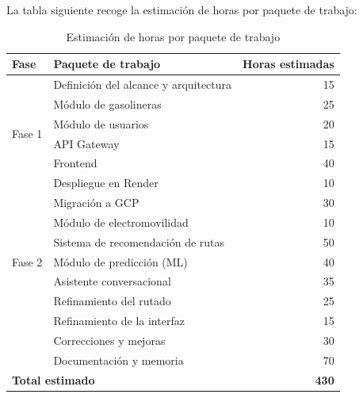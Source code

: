 La tabla siguiente recoge la estimación de horas por paquete de trabajo:

\begin{table}[H]
  \centering
  \caption{Estimación de horas por paquete de trabajo}
  \label{tab:estimacion_horas}
  \begin{tabular}{llr}
    \toprule
    \textbf{Fase}                               & \textbf{Paquete de trabajo}           & \textbf{Horas estimadas} \\
    \midrule
    \multirow{6}{*}{Fase 1}
                                                & Definición del alcance y arquitectura & 15                       \\
                                                & Módulo de gasolineras                 & 25                       \\
                                                & Módulo de usuarios                    & 20                       \\
                                                & API Gateway                           & 15                       \\
                                                & Frontend                              & 40                       \\
                                                & Despliegue en Render                  & 10                       \\
    \midrule
    \multirow{7}{*}{Fase 2}
                                                & Migración a GCP                       & 30                       \\
                                                & Módulo de electromovilidad            & 10                       \\
                                                & Sistema de recomendación de rutas     & 50                       \\
                                                & Módulo de predicción (ML)             & 40                       \\
                                                & Asistente conversacional              & 35                       \\
                                                & Refinamiento del rutado               & 25                       \\
                                                & Refinamiento de la interfaz           & 15                       \\
                                                & Correcciones y mejoras                & 30                       \\
                                                & Documentación y memoria               & 70                       \\
    \midrule
    \multicolumn{2}{l}{\textbf{Total estimado}} & \textbf{430}                                                     \\
    \bottomrule
  \end{tabular}
\end{table}


